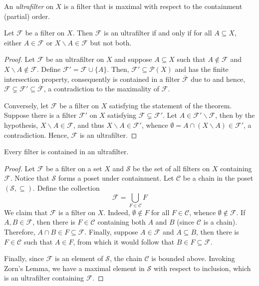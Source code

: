 \begin{definition}[Ultrafilter]
    An \textit{ultrafilter} on $X$ is a filter that is maximal with respect to the containment (partial) order.
\end{definition}

\begin{theorem}
    Let $\mathcal F$ be a filter on $X$. Then $\mathcal F$ is an ultrafilter if and only if for all $A\subseteq X$, either $A\in\mathcal F$ or $X\backslash A\in\mathcal F$ but not both.
\end{theorem}
\begin{proof}
    Let $\mathcal F$ be an ultrafilter on $X$ and suppose $A\subseteq X$ such that $A\notin\mathcal F$ and $X\backslash A\notin\mathcal F$. Define $\mathcal F' = \mathcal F\cup\{A\}$. Then, $\mathcal F'\subseteq\mathcal P(X)$ and has the finite intersection property, consequently is contained in a filter $\overline{\mathcal F}$ due to  and hence, $\mathcal F\subsetneq\mathcal F'\subseteq\overline{\mathcal F}$, a contradiction to the maximality of $\mathcal F$.

    Conversely, let $\mathcal F$ be a filter on $X$ satisfying the statement of the theorem. Suppose there is a filter $\mathcal F'$ on $X$ satisfying $\mathcal F\subsetneq\mathcal F'$. Let $A\in\mathcal F'\backslash\mathcal F$, then by the hypothesis, $X\backslash A\in\mathcal F$, and thus $X\backslash A\in\mathcal F'$, whence $\emptyset = A\cap(X\backslash A)\in\mathcal F'$, a contradiction. Hence, $\mathcal F$ is an ultrafilter.
\end{proof}

\begin{lemma}
    Every filter is contained in an ultrafilter.
\end{lemma}
\begin{proof}
    Let $\mathcal F$ be a filter on a set $X$ and $\mathscr S$ be the set of all filters on $X$ containing $\mathcal F$. Notice that $\mathscr S$ forms a poset under containment. Let $\mathscr C$ be a chain in the poset $(\mathscr S,\subseteq)$. Define the collection 
    \begin{equation*}
        \mathscr F = \bigcup_{F\in\mathscr C} F
    \end{equation*}
    We claim that $\mathscr F$ is a filter on $X$. Indeed, $\emptyset\notin F$ for all $F\in\mathscr C$, whence $\emptyset\notin\mathscr F$. If $A,B\in\mathscr F$, then there is $F\in\mathscr C$ containing both $A$ and $B$ (since $\mathscr C$ is a chain). Therefore, $A\cap B\in F\subseteq\mathscr F$. Finally, suppose $A\in\mathscr F$ and $A\subseteq B$, then there is $F\in\mathscr C$ such that $A\in F$, from which it would follow that $B\in F\subseteq\mathscr F$.

    Finally, since $\mathscr F$ is an element of $\mathscr S$, the chain $\mathscr C$ is bounded above. Invoking Zorn's Lemma, we have a maximal element in $\mathscr S$ with respect to inclusion, which is an ultrafilter containing $\mathcal F$.
\end{proof}

